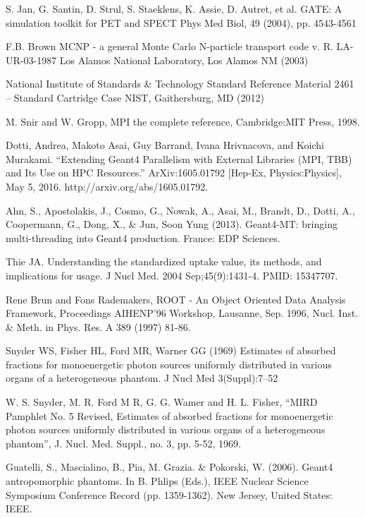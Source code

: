 \documentclass[letterpaper,12pt]{article}
\begin{document}
\begin{thebibliography}{99}
 S. Jan, G. Santin, D. Strul, S. Staeklens, K. Assie, D. Autret, et al. GATE: A simulation toolkit for PET and SPECT
Phys Med Biol, 49 (2004), pp. 4543-4561

 F.B. Brown MCNP - a general Monte Carlo N-particle transport code v. R. LA-UR-03-1987 Los Alamos National Laboratory, Los Alamos NM (2003)

 National Institute of Standards \& Technology Standard Reference Material 2461 – Standard Cartridge Case NIST, Gaithersburg, MD (2012)


 M. Snir and W. Gropp, MPI the complete reference, Cambridge:MIT Press, 1998.

 Dotti, Andrea, Makoto Asai, Guy Barrand, Ivana Hrivnacova, and Koichi Murakami. “Extending Geant4 Parallelism with External Libraries (MPI, TBB) and Its Use on HPC Resources.” ArXiv:1605.01792 [Hep-Ex, Physics:Physics], May 5, 2016. http://arxiv.org/abs/1605.01792.

 Ahn, S., Apostolakis, J., Cosmo, G., Nowak, A., Asai, M., Brandt, D., Dotti, A., Coopermann, G., Dong, X., \& Jun, Soon Yung (2013). Geant4-MT: bringing multi-threading into Geant4 production. France: EDP Sciences.

 Thie JA. Understanding the standardized uptake value, its methods, and implications for usage. J Nucl Med. 2004 Sep;45(9):1431-4. PMID: 15347707.


 Rene Brun and Fons Rademakers, ROOT - An Object Oriented Data Analysis Framework, Proceedings AIHENP'96 Workshop, Lausanne, Sep. 1996, Nucl. Inst. \& Meth. in Phys. Res. A 389 (1997) 81-86.

 Snyder WS, Fisher HL, Ford MR, Warner GG (1969) Estimates of absorbed fractions for monoenergetic photon sources uniformly distributed in various organs of a heterogeneous phantom. J Nucl Med 3(Suppl):7–52

 W. S. Snyder, M. R. Ford M R, G. G. Wamer and H. L. Fisher, “MIRD Pamphlet No. 5 Revised, Estimates of absorbed fractions for monoenergetic photon sources uniformly distributed in various organs of a heterogeneous phantom”, J. Nucl. Med. Suppl., no. 3, pp. 5-52, 1969.

 Guatelli, S., Mascialino, B., Pia, M. Grazia. \& Pokorski, W. (2006). Geant4 antropomorphic phantoms. In B. Phlips (Eds.), IEEE Nuclear Science Symposium Conference Record (pp. 1359-1362). New Jersey, United States: IEEE.


\end{thebibliography}
\end{document}
